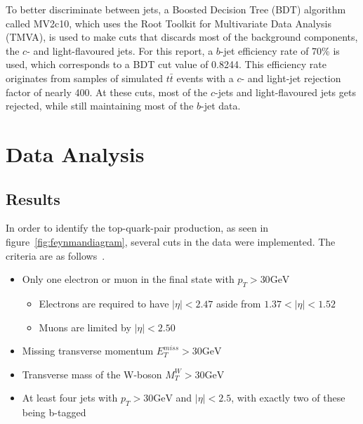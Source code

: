 \documentclass[12pt,a4paper]{article}
\numberwithin{equation}{section}
\begin{document}
To better discriminate between jets, a Boosted Decision Tree (BDT) algorithm
called MV2c10, which uses the Root Toolkit for Multivariate Data Analysis
(TMVA), is used to make cuts that discards most of the background components,
the $c$- and light-flavoured jets. For this report, a $b$-jet efficiency rate of
70\% is used, which corresponds to a BDT cut value of 0.8244. This efficiency
rate originates from samples of simulated $t\bar t$ events with a $c$- and
light-jet rejection factor of nearly 400\cite{ATL-PHYS-PUB-2016-012}. At these
cuts, most of the $c$-jets and light-flavoured jets gets rejected, while still
maintaining most of the $b$-jet data.


\section{Data Analysis}

\subsection{Results}\label{sec:results}
In order to identify the top-quark-pair production, as seen in
figure~\ref{fig:feynmandiagram}, several cuts in the data were implemented. The
criteria are as follows~\cite{oreach2020}.
\begin{itemize}
  \item Only one electron or muon in the final state with $p_{T} > 30 \mathrm{GeV}$
  \begin{itemize}
    \item Electrons are required to have $|\eta| < 2.47$ aside from $1.37 < |\eta| < 1.52$
    \item Muons are limited by $|\eta| < 2.50$
  \end{itemize}
  \item Missing transverse momentum $E_{T}^{miss} > 30 \mathrm{GeV}$
  \item Transverse mass of the W-boson $M_{T}^{W} > 30 \mathrm{GeV}$
  \item At least four jets with $p_{T} > 30 \mathrm{GeV}$ and $|\eta| < 2.5$, with
        exactly two of these being b-tagged
\end{itemize}
\end{document}
